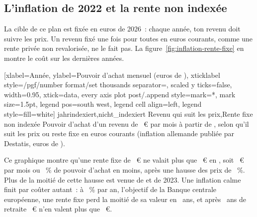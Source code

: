 \subsection{L'inflation de 2022 et la rente non index\'ee}\label{sec:risques-inflation}

La cible de ce plan est fix\'ee en euros de 2026~: chaque ann\'ee, ton revenu doit suivre les prix. Un
revenu fix\'e une fois pour toutes en euros courants, comme une rente priv\'ee non revaloris\'ee, ne le
fait pas. La figure~\ref{fig:inflation-rente-fixe} en montre le co\^ut sur les derni\`eres ann\'ees.


[xlabel={Ann\'ee},
  ylabel={Pouvoir d'achat mensuel (euros de \InflationSerieDebut)},
  xticklabel style={/pgf/number format/set thousands separator={}}, scaled y ticks=false,
  width=0.95\linewidth, xtick=data,
  every axis plot post/.append style={mark=*, mark size=1.5pt},
  legend pos=south west, legend cell align=left, legend style={fill=white}]%
  {jahr}{indexiert,nicht_indexiert}%
  {{Revenu qui suit les prix},{Rente fixe non index\'ee}}%
  {Pouvoir d'achat d'un revenu de \ZielMonat~€ par mois \`a partir de \InflationSerieDebut, selon qu'il
  suit les prix ou reste fixe en euros courants (inflation allemande publi\'ee par Destatis, euros de
  \InflationSerieDebut).\label{fig:inflation-rente-fixe}}

Ce graphique montre qu'une rente fixe de \ZielMonat~€ ne valait plus que \RenteNonIndexeeFin~€ en
\InflationSerieFin, soit \RentePerteMois~€ par mois ou \RentePerteProzent~\% de pouvoir d'achat en
moins, apr\`es une hausse des prix de \PrixHausseCumulee~\%. Plus de la moiti\'e de cette hausse est
venue de \InflationPicAnnee{} et de 2023. Une inflation calme finit par co\^uter autant~: \`a
\InflationZiel~\% par an, l'objectif de la Banque centrale europ\'eenne, une rente
fixe perd la moiti\'e de sa valeur en \RenteMoitieAns~ans, et apr\`es \McRenteAns~ans de retraite
\ZielMonat~€ n'en valent plus que \RenteApresRetraite~€.

